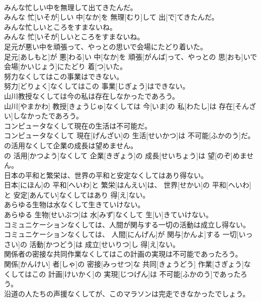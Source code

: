 \documentclass[8pt]{extreport}
\begin{document}
\begin{CJK}{UTF8}{min}
\\	みんな忙しい中を無理して出てきたんだ。	
\\	みんな 忙[いそが]しい 中[なか]を 無理[むり]して 出[で]てきたんだ。
\\	みんな忙しいところをすまないね。	
\\	みんな 忙[いそが]しいところをすまないね。
\\	足元が悪い中を頑張って、やっとの思いで会場にたどり着いた。	
\\	足元[あしもと]が 悪[わる]い 中[なか]を 頑張[がんば]って、やっとの 思[おも]いで 会場[かいじょう]にたどり 着[つ]いた。
\\	努力なくしてはこの事業はできない。	
\\	努力[どりょく]なくしてはこの 事業[じぎょう]はできない。
\\	山川教授なくしては今の私は存在しなかったであろう。	
\\	山川[やまかわ] 教授[きょうじゅ]なくしては 今[いま]の 私[わたし]は 存在[そんざい]しなかったであろう。
\\	コンピュータなくして現在の生活は不可能だ。	
\\	コンピュータなくして 現在[げんざい]の 生活[せいかつ]は 不可能[ふかのう]だ。
\\	の活用なくして企業の成長は望めません。	
\\	の 活用[かつよう]なくして 企業[きぎょう]の 成長[せいちょう]は 望[のぞ]めません。
\\	日本の平和と繁栄は、世界の平和と安定なくしてはあり得ない。	
\\	日本[にほん]の 平和[へいわ]と 繁栄[はんえい]は、 世界[せかい]の 平和[へいわ]と 安定[あんてい]なくしてはあり 得[え]ない。
\\	あらゆる生物は水なくして生きていけない。	
\\	あらゆる 生物[せいぶつ]は 水[みず]なくして 生[い]きていけない。
\\	コミュニケーションなくしては、人間が関与する一切の活動は成立し得ない。	
\\	コミュニケーションなくしては、 人間[にんげん]が 関与[かんよ]する 一切[いっさい]の 活動[かつどう]は 成立[せいりつ]し 得[え]ない。
\\	関係者の密接な共同作業なくしてはこの計画の実現は不可能であったろう。	
\\	関係[かんけい] 者[しゃ]の 密接[みっせつ]な 共同[きょうどう] 作業[さぎょう]なくしてはこの 計画[けいかく]の 実現[じつげん]は 不可能[ふかのう]であったろう。
\\	沿道の人たちの声援なくしてが、このマラソンは完走できなかったでしょう。	

\end{CJK}
\end{document}
